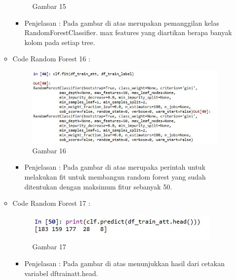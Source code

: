 \begin{enumerate}
\begin{itemize}
\begin{figure}[ht]
\caption{Gambar 15}
\label{contoh}
\end{figure}
\par
\begin{itemize} 
\item Penjelasan : Pada gambar di atas merupakan pemanggilan kelas RandomForestClassifier. max features yang diartikan berapa banyak kolom pada setiap tree.
\par
\par
\end{itemize}
\item Code Random Forest 16 :
\par
\begin{figure}[ht]
\centering
\includegraphics[scale=0.7]{figures/AFS/4p.jpg}
\caption{Gambar 16}
\label{contoh}
\end{figure}
\par
\begin{itemize}
\item Penjelasan : Pada gambar di atas merupaka perintah untuk melakukan fit untuk membangun random forest yang sudah ditentukan dengan maksimum fitur sebanyak 50.
\par
\par
\end{itemize}
\item Code Random Forest 17 :
\par
\begin{figure}[ht]
\centering
\includegraphics[scale=0.7]{figures/AFS/4q.jpg}
\caption{Gambar 17}
\label{contoh}
\end{figure}
\par
\begin{itemize}
\item Penjelasan : Pada gambar di atas menunjukkan hasil dari cetakan variabel dftrainatt.head.
\par

\end{itemize}
\end{itemize}
\end{enumerate}
